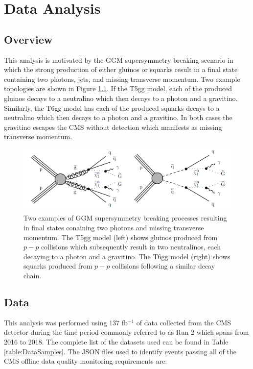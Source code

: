 \chapter{Data Analysis}

\section{Overview}



This analysis is motivated by the GGM supersymmetry breaking scenario in which the strong production of either gluinos or squarks result in a final state containing two photons, jets, and missing transverse momentum.  Two example topologies are shown in Figure \ref{fig:susysignals}.  If the T5gg model, each of the produced gluinos decays to a neutralino which then decays to a photon and a gravitino.  Similarly, the T6gg model has each of the produced squarks decays to a neutralino which then decays to a photon and a gravitino.  In both cases the gravitino escapes the CMS without detection which manifests as missing transverse momentum.  

\begin{figure}[h]
	\centering
	\includegraphics[width=0.9\linewidth]{Figures/SUSYsignals}
	\caption{Two examples of GGM supersymmetry breaking processes resulting in final states conaining two photons and missing transverse momentum. The T5gg model (left) shows gluinos produced from $p-p$ collisions which subsequently result in two neutralinos, each decaying to a photon and a gravitino. The T6gg model (right) shows squarks produced from $p-p$ collisions following a similar decay chain.}
	\label{fig:susysignals}
\end{figure}


\section{Data}
This analysis was performed using 137 fb$^{-1}$ of data collected from the CMS detector during the time period commonly referred to as Run 2 which spans from  2016 to 2018.  The complete list of the datasets used can be found in Table \ref{table:DataSamples}.  The JSON files used to identify events passing all of the CMS offline data quality monitoring requirements are:

